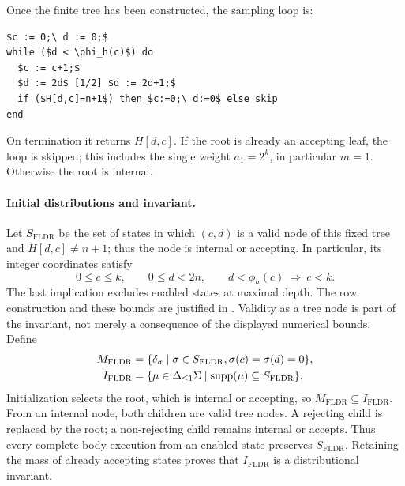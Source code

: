 Once the finite tree has been constructed, the sampling loop is:
\begin{lstlisting}[basicstyle=\ttfamily\small,mathescape=true,frame=single]
$c := 0;\ d := 0;$
while ($d < \phi_h(c)$) do
  $c := c+1;$
  $d := 2d$ [1/2] $d := 2d+1;$
  if ($H[d,c]=n+1$) then $c:=0;\ d:=0$ else skip
end
\end{lstlisting}
On termination it returns $H[d,c]$. If the root is already an accepting
leaf, the loop is skipped; this includes the single weight $a_1=2^k$,
in particular $m=1$. Otherwise the root is internal.

\paragraph{Initial distributions and invariant.}
Let $S_{\mathrm{FLDR}}$ be the set of states in which $(c,d)$ is a
valid node of this fixed tree and $H[d,c]\ne n+1$; thus the node is
internal or accepting. In particular, its integer coordinates satisfy
\begin{equation}
 0\le c\le k,\qquad 0\le d<2n,
 \qquad d<\phi_h(c)\ \Longrightarrow\ c<k.
 \label{eq:fldr-support}
\end{equation}
The last implication excludes enabled states at maximal depth.
The row construction and these bounds are justified in
. Validity as a tree node is part of the
invariant, not merely a consequence of the displayed numerical bounds.
Define
\[
 \begin{aligned}
 M_{\mathrm{FLDR}}
   &=\{\delta_{\sigma}\mid\sigma\in S_{\mathrm{FLDR}},
                         \sigma(c)=\sigma(d)=0\},\\
 I_{\mathrm{FLDR}}
   &=\{\mu\in{\Delta_{\leq 1}\Sigma}\mid\textnormal{supp}(\mu)\subseteq S_{\mathrm{FLDR}}\}.
 \end{aligned}
\]
Initialization selects the root, which is internal or accepting, so
$M_{\mathrm{FLDR}}\subseteq I_{\mathrm{FLDR}}$. From an internal node,
both children are valid tree nodes. A rejecting child is replaced by
the root; a non-rejecting child remains internal or accepts. Thus every
complete body execution from an enabled state preserves $S_{\mathrm{FLDR}}$. Retaining the
mass of already accepting states proves that $I_{\mathrm{FLDR}}$ is a
distributional invariant.

